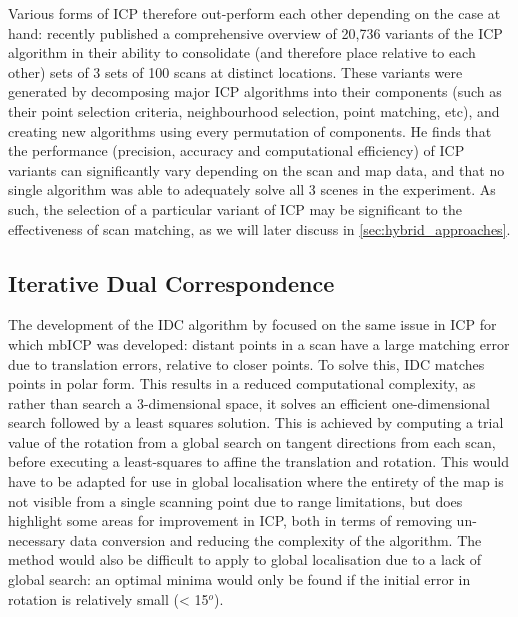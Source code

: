 \documentclass[authoryearcitations]{UoYCSproject}
\begin{document}
Various forms of ICP therefore out-perform each other depending on the case at hand: \citet{Donoso2017-wp} recently published a comprehensive overview of 20,736 variants of the ICP algorithm in their ability to consolidate (and therefore place relative to each other) sets of 3 sets of 100 scans at distinct locations. These variants were generated by decomposing major ICP algorithms into their components (such as their point selection criteria, neighbourhood selection, point matching, etc), and creating new algorithms using every permutation of components. He finds that the performance (precision, accuracy and computational efficiency) of ICP variants can significantly vary depending on the scan and map data, and that no single algorithm was able to adequately solve all 3 scenes in the experiment. As such, the selection of a particular variant of ICP may be significant to the effectiveness of scan matching, as we will later discuss in \ref{sec:hybrid_approaches}.


\subsection{Iterative Dual Correspondence}

The development of the IDC algorithm by \citet{Lu1997-zv} focused on the same issue in ICP for which mbICP was developed: distant points in a scan have a large matching error due to translation errors, relative to closer points. To solve this, IDC matches points in polar form. This results in a reduced computational complexity, as rather than search a 3-dimensional space, it solves an efficient one-dimensional search followed by a least squares solution. This is achieved by computing a trial value of the rotation from a global search on tangent directions from each scan, before executing a least-squares to affine the translation and rotation. This would have to be adapted for use in global localisation where the entirety of the map is not visible from a single scanning point due to range limitations, but does highlight some areas for improvement in ICP, both in terms of removing un-necessary data conversion and reducing the complexity of the algorithm. The method would also be difficult to apply to global localisation due to a lack of global search: an optimal minima would only be found if the initial error in rotation is relatively small (< 15$^o$).
\end{document}
